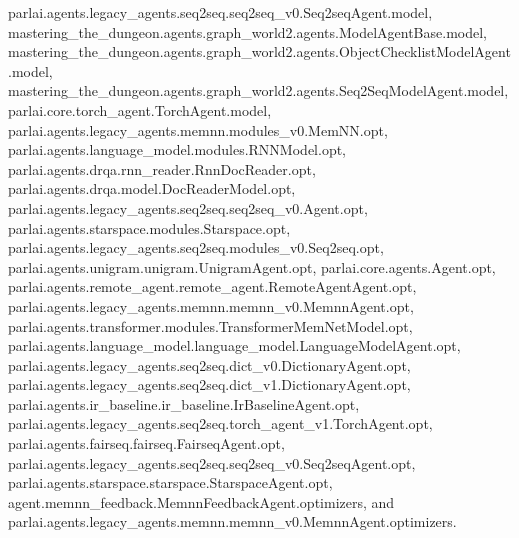 parlai.\+agents.\+legacy\+\_\+agents.\+seq2seq.\+seq2seq\+\_\+v0.\+Seq2seq\+Agent.\+model, mastering\+\_\+the\+\_\+dungeon.\+agents.\+graph\+\_\+world2.\+agents.\+Model\+Agent\+Base.\+model, mastering\+\_\+the\+\_\+dungeon.\+agents.\+graph\+\_\+world2.\+agents.\+Object\+Checklist\+Model\+Agent.\+model, mastering\+\_\+the\+\_\+dungeon.\+agents.\+graph\+\_\+world2.\+agents.\+Seq2\+Seq\+Model\+Agent.\+model, parlai.\+core.\+torch\+\_\+agent.\+Torch\+Agent.\+model, parlai.\+agents.\+legacy\+\_\+agents.\+memnn.\+modules\+\_\+v0.\+Mem\+N\+N.\+opt, parlai.\+agents.\+language\+\_\+model.\+modules.\+R\+N\+N\+Model.\+opt, parlai.\+agents.\+drqa.\+rnn\+\_\+reader.\+Rnn\+Doc\+Reader.\+opt, parlai.\+agents.\+drqa.\+model.\+Doc\+Reader\+Model.\+opt, parlai.\+agents.\+legacy\+\_\+agents.\+seq2seq.\+seq2seq\+\_\+v0.\+Agent.\+opt, parlai.\+agents.\+starspace.\+modules.\+Starspace.\+opt, parlai.\+agents.\+legacy\+\_\+agents.\+seq2seq.\+modules\+\_\+v0.\+Seq2seq.\+opt, parlai.\+agents.\+unigram.\+unigram.\+Unigram\+Agent.\+opt, parlai.\+core.\+agents.\+Agent.\+opt, parlai.\+agents.\+remote\+\_\+agent.\+remote\+\_\+agent.\+Remote\+Agent\+Agent.\+opt, parlai.\+agents.\+legacy\+\_\+agents.\+memnn.\+memnn\+\_\+v0.\+Memnn\+Agent.\+opt, parlai.\+agents.\+transformer.\+modules.\+Transformer\+Mem\+Net\+Model.\+opt, parlai.\+agents.\+language\+\_\+model.\+language\+\_\+model.\+Language\+Model\+Agent.\+opt, parlai.\+agents.\+legacy\+\_\+agents.\+seq2seq.\+dict\+\_\+v0.\+Dictionary\+Agent.\+opt, parlai.\+agents.\+legacy\+\_\+agents.\+seq2seq.\+dict\+\_\+v1.\+Dictionary\+Agent.\+opt, parlai.\+agents.\+ir\+\_\+baseline.\+ir\+\_\+baseline.\+Ir\+Baseline\+Agent.\+opt, parlai.\+agents.\+legacy\+\_\+agents.\+seq2seq.\+torch\+\_\+agent\+\_\+v1.\+Torch\+Agent.\+opt, parlai.\+agents.\+fairseq.\+fairseq.\+Fairseq\+Agent.\+opt, parlai.\+agents.\+legacy\+\_\+agents.\+seq2seq.\+seq2seq\+\_\+v0.\+Seq2seq\+Agent.\+opt, parlai.\+agents.\+starspace.\+starspace.\+Starspace\+Agent.\+opt, agent.\+memnn\+\_\+feedback.\+Memnn\+Feedback\+Agent.\+optimizers, and parlai.\+agents.\+legacy\+\_\+agents.\+memnn.\+memnn\+\_\+v0.\+Memnn\+Agent.\+optimizers.

\mbox{\label{classagent_1_1memnn__feedback_1_1MemnnFeedbackAgent_a1916ceda9d655dc5b1b2ed2e5d65da4f}} 
